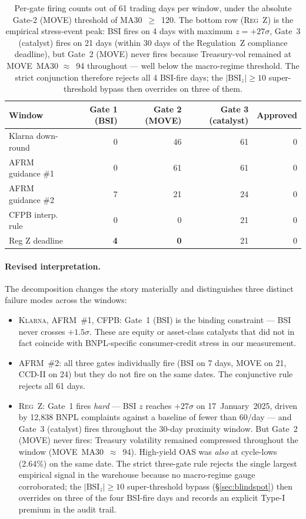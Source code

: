 \documentclass[11pt,letterpaper]{article}
\newcommand{\bsi}{\text{BSI}}
\begin{document}
\begin{table}[H]
\centering
\small
\begin{tabular}{lrrrr}
\toprule
\textbf{Window} & \textbf{Gate 1 (BSI)} & \textbf{Gate 2 (MOVE)} &
\textbf{Gate 3 (catalyst)} & \textbf{Approved}\\
\midrule
Klarna down-round &  0 & 46 & 61 & 0\\
AFRM guidance \#1 &  0 & 61 & 61 & 0\\
AFRM guidance \#2 &  7 & 21 & 24 & 0\\
CFPB interp. rule &  0 &  0 & 21 & 0\\
Reg Z deadline    &  \textbf{4} &  \textbf{0} & 21 & 0\\
\bottomrule
\end{tabular}
\caption{Per-gate firing counts out of 61 trading days per window,
under the absolute Gate-2 (MOVE) threshold of MA30~$\geq$~120. The
bottom row (\textsc{Reg~Z}) is the empirical stress-event peak: BSI
fires on 4 days with maximum $z = +27\sigma$, Gate~3 (catalyst) fires
on 21 days (within 30 days of the Regulation~Z compliance deadline),
but Gate~2 (MOVE) never fires because Treasury-vol remained at
MOVE~MA30 $\approx$~94 throughout --- well below the macro-regime
threshold. The strict conjunction therefore rejects all 4 BSI-fire
days; the $|\bsi_z|\geq10$ super-threshold bypass then
overrides on three of them.}
\label{tab:gatedecomp}
\end{table}

\paragraph{Revised interpretation.}
The decomposition changes the story materially and distinguishes three
distinct failure modes across the windows:
\begin{itemize}[leftmargin=*,itemsep=2pt]
\item \textsc{Klarna}, \textsc{AFRM~\#1}, \textsc{CFPB}: Gate~1 (BSI)
is the binding constraint --- BSI never crosses $+1.5\sigma$. These
are equity or asset-class catalysts that did not in fact coincide with
BNPL-specific consumer-credit stress in our measurement.
\item \textsc{AFRM~\#2}: all three gates individually fire (BSI on 7
days, MOVE on 21, CCD-II on 24) but they do not fire on the same
dates. The conjunctive rule rejects all 61 days.
\item \textsc{Reg~Z}: Gate~1 fires \emph{hard} --- BSI $z$ reaches
$+27\sigma$ on 17~January~2025, driven by 12{,}838 BNPL complaints
against a baseline of fewer than 60/day --- and Gate~3 (catalyst)
fires throughout the 30-day proximity window. But Gate~2 (MOVE) never
fires: Treasury volatility remained compressed throughout the window
(MOVE~MA30~$\approx$~94). High-yield OAS was \emph{also} at
cycle-lows (2.64\%) on the same date. The strict three-gate rule
rejects the single largest empirical signal in the warehouse because
no macro-regime gauge corroborated; the $|\bsi_z|\geq10$
super-threshold bypass (\S\ref{sec:blindspot}) then overrides on
three of the four BSI-fire days and records an explicit Type-I
premium in the audit trail.
\end{itemize}
\end{document}
